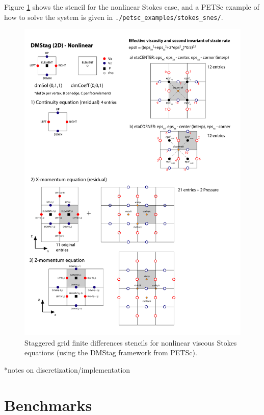 \documentclass[a4paper,11pt]{article}
\begin{document}
Figure \ref{fig:stokes_snes} shows the stencil for the nonlinear Stokes case, and a PETSc example of how to solve the system is given in \texttt{./petsc\_examples/stokes\_snes/}.

\begin{figure}
\begin{center}
\noindent \includegraphics[trim=0mm 0mm 0mm 0mm, clip, width=\textwidth]{stencils-Stokes_snes.pdf} 
\caption{Staggered grid finite differences stencils for nonlinear viscous Stokes equations (using the DMStag framework from PETSc).}
\label{fig:stokes_snes}
  \end{center}
\end{figure}

*notes on discretization/implementation

\section{Benchmarks}
\end{document}
